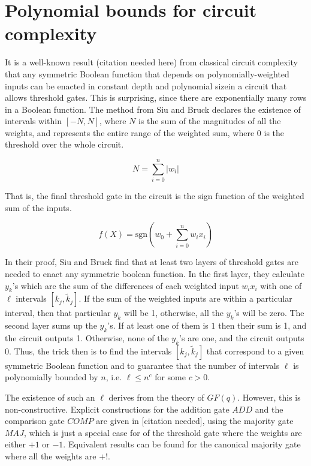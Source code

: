 \documentclass{article}
\begin{document}
\section{Polynomial bounds for circuit complexity}

It is a well-known result (citation needed here) from classical circuit
complexity that any symmetric Boolean function that depends on 
polynomially-weighted inputs can be enacted in constant depth and polynomial
sizein a circuit
that allows threshold gates. This is surprising, since there are
exponentially many rows in a Boolean function. The method from Siu and Bruck
declares the existence of intervals within $[-N,N]$, where $N$ is the sum
of the magnitudes of all the weights, and represents the entire range
of the weighted sum, where $0$ is the threshold over the whole circuit.

\begin{equation}
N = \sum_{i=0}^n | w_i |
\end{equation}

That is, the final threshold gate in the circuit is the sign function of
the weighted sum of the inputs.

\begin{equation}
f(X) = \text{sgn} \left( w_0 + \sum_{i=0}^n w_i x_i \right)
\end{equation}

In their proof, Siu and Bruck find that at least two layers of threshold
gates are needed to enact any symmetric boolean function. In the first layer,
they calculate $y_k$'s which are the sum of the differences of each weighted
input $w_i x_i$ with one of $\ell$ intervals $[k_j, \tilde{k}_j]$. If the
sum of the weighted inputs are within a particular interval, then that particular
$y_k$ will be 1, otherwise, all the $y_k$'s will be zero.
The second layer sums up the $y_k$'s. If at least one of them is $1$ then their
sum is 1, and the circuit outputs 1. Otherwise, none of the $y_k$'s are one,
and the circuit outputs 0. Thus, the trick then is to find the intervals
$[k_j, \tilde{k}_j]$ that correspond to a given symmetric Boolean function and
to guarantee that the number of intervals $\ell$ is polynomially bounded by
$n$, i.e. $\ell \le n^c$ for some $c>0$.

The existence of such an $\ell$ derives from the theory of $GF(q)$. However,
this is non-constructive. Explicit constructions for the addition gate
$ADD$ and the comparison gate $COMP$ are given in [citation needed],
using the majority gate $MAJ$, which is just a special case for of the
threshold gate where the weights are either $+1$ or $-1$. Equivalent results
can be found for the canonical majority gate where all the weights are
$+!$.
\end{document}
